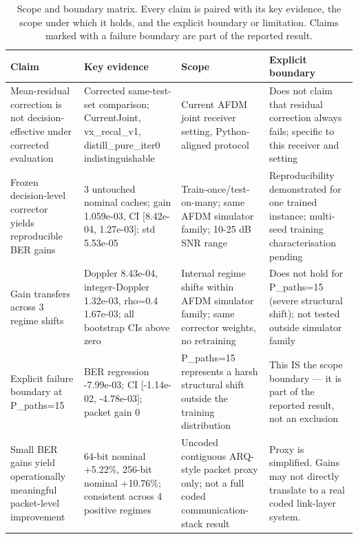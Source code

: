 \begin{table}[t]
\centering
\caption{Scope and boundary matrix. Every claim is paired with its key evidence, the scope under which it holds, and the explicit boundary or limitation. Claims marked with a failure boundary are part of the reported result.}
\label{tab:fyp_claim_scope}
\setlength{\tabcolsep}{4pt}
\begin{tabular}{p{3.2cm}p{3.2cm}p{2.8cm}p{3.6cm}}
\toprule
\textbf{Claim} & \textbf{Key evidence} & \textbf{Scope} & \textbf{Explicit boundary} \\
\midrule
Mean-residual correction is not decision-effective under corrected evaluation & Corrected same-test-set comparison; CurrentJoint, vx\_recal\_v1, distill\_pure\_iter0 indistinguishable & Current AFDM joint receiver setting, Python-aligned protocol & Does not claim that residual correction always fails; specific to this receiver and setting \\
Frozen decision-level corrector yields reproducible BER gains & 3 untouched nominal caches; gain 1.059e-03, CI [8.42e-04, 1.27e-03]; std 5.53e-05 & Train-once/test-on-many; same AFDM simulator family; 10-25 dB SNR range & Reproducibility demonstrated for one trained instance; multi-seed training characterisation pending \\
Gain transfers across 3 regime shifts & Doppler 8.43e-04, integer-Doppler 1.32e-03, rho=0.4 1.67e-03; all bootstrap CIs above zero & Internal regime shifts within AFDM simulator family; same corrector weights, no retraining & Does not hold for P\_paths=15 (severe structural shift); not tested outside simulator family \\
Explicit failure boundary at P\_paths=15 & BER regression -7.99e-03; CI [-1.14e-02, -4.78e-03]; packet gain 0 & P\_paths=15 represents a harsh structural shift outside the training distribution & This IS the scope boundary — it is part of the reported result, not an exclusion \\
Small BER gains yield operationally meaningful packet-level improvement & 64-bit nominal +5.22\%, 256-bit nominal +10.76\%; consistent across 4 positive regimes & Uncoded contiguous ARQ-style packet proxy only; not a full coded communication-stack result & Proxy is simplified. Gains may not directly translate to a real coded link-layer system. \\
\bottomrule
\end{tabular}
\end{table}
